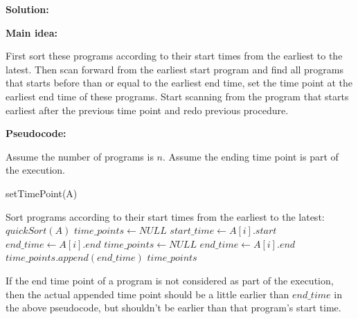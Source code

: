 \documentclass{article}
\begin{document}
{\color{blue}
\par\textbf{Solution: }
\par\textbf{Main idea: }
\par First sort these programs according to their start times from the earliest to the latest. Then scan forward from the earliest start program and find all programs that starts before than or equal to the earliest end time, set the time point at the earliest end time of these programs. Start scanning from the program that starts earliest after the previous time point and redo previous procedure.\\

\par\textbf{Pseudocode: }
\par Assume the number of programs is $n$. Assume the ending time point is part of the execution.
\begin{algorithm}
	\caption{setTimePoint(A)}
	\label{alg2}
	\color{blue}
	\begin{algorithmic}
		\STATE Sort programs according to their start times from the earliest to the latest: $quickSort(A)$
		\STATE $time\_points \gets NULL$
			\STATE $start\_time \gets A[i].start$
			\STATE $end\_time \gets A[i].end$
			\STATE $time\_points \gets NULL$
					\STATE $end\_time \gets A[i].end$
				\ENDIF
			\ENDWHILE
			\STATE $time\_points.append(end\_time)$
		\ENDWHILE
		\RETURN $time\_points$
	\end{algorithmic}
\end{algorithm}
\par If the end time point of a program is not considered as part of the execution, then the actual appended time point should be a little earlier than $end\_time$ in the above pseudocode, but shouldn't be earlier than that program's start time.\\

}
\end{document}
